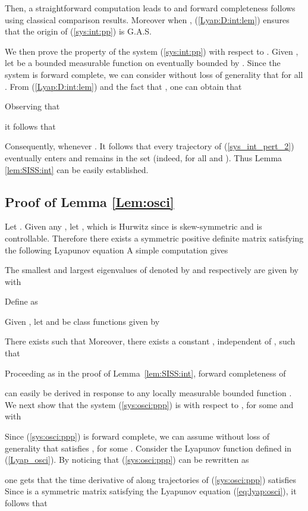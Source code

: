 \documentclass[letterpaper, 10pt]{article}
\newcommand{\rref}[1]{(\ref{#1})}
\begin{document}
Then, a straightforward computation leads to 
and forward completeness follows using classical comparison results. Moreover when , \rref{Lyap:D:int:lem} ensures that the origin of \rref{sys:int:pp} is G.A.S.

We then prove  the  property of the system \rref{sys:int:pp} with respect to .
Given , let  be a bounded measurable function on  eventually bounded by . Since the system is forward complete, we can consider without loss of generality that
 for all . From \rref{Lyap:D:int:lem} and the fact that , one can obtain that

Observing that 

it follows that
 
Consequently,  whenever . It follows that every trajectory of \rref{sys_int_pert_2} eventually enters and remains in the set  (indeed,  for all  and ). Thus Lemma \ref{lem:SISS:int} can be easily established.



\subsection{Proof of Lemma \ref{Lem:osci}}

Let . Given any , let , which is Hurwitz since  is skew-symmetric and  is controllable. Therefore there exists a symmetric positive definite matrix  satisfying the following Lyapunov equation 
 A simple computation gives
 
The smallest and largest eigenvalues of  denoted by  and  respectively are given by
 with


Define  as 
 
Given , let  and  be class  functions given by
 

There exists  such that
 Moreover, there exists a constant , independent of , such that 




Proceeding as in the proof of Lemma~\ref{lem:SISS:int}, forward completeness of 
 
can easily be derived in response to any locally measurable bounded function . 
We next show that  the system \rref{sys:osci:ppp} is  with respect to , for some  and with

Since \rref{sys:osci:ppp} is forward complete, we can assume without loss of generality that  satisfies , for some . Consider the Lyapunov function  defined in \rref{Lyap_osci}. By noticing that \rref{sys:osci:ppp} can be rewritten as
 
one gets that the time derivative of  along trajectories of \rref{sys:osci:ppp} satisfies 
 Since  is a symmetric matrix satisfying the Lyapunov equation \rref{eq:lyap:osci}, it follows that
\end{document}
